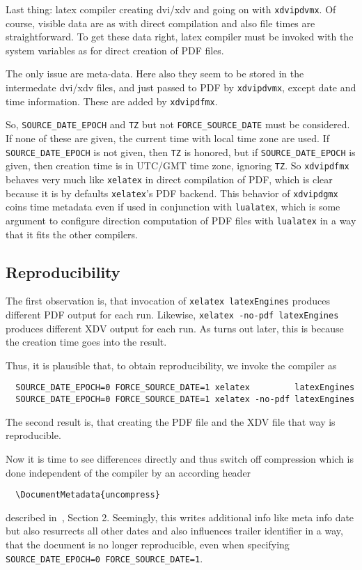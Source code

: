 \documentclass[a4paper, english]{article}%
\newcommand{\lualatex}{\texttt{lualatex}}
\newcommand{\xelatex}{\texttt{xelatex}}
\begin{document}
Last thing: 
latex compiler creating dvi/xdv and going on with \texttt{xdvipdvmx}. 
Of course, visible data are as with direct compilation and also file times are straightforward. 
To get these data right, latex compiler must be invoked with the system variables 
as for direct creation of PDF files. 

The only issue are meta-data. 
Here also they seem to be stored in the intermedate dvi/xdv files, 
and just passed to PDF by \texttt{xdvipdvmx}, 
except date and time information. 
These are added by \texttt{xdvipdfmx}. 

So, \texttt{SOURCE\_DATE\_EPOCH} and \texttt{TZ} but not \texttt{FORCE\_SOURCE\_DATE} 
must be considered. 
If none of these are given, the current time with local time zone are used. 
If \texttt{SOURCE\_DATE\_EPOCH} is not given, then \texttt{TZ} is honored, 
but if \texttt{SOURCE\_DATE\_EPOCH} is given, then creation time is in UTC/GMT time zone, 
ignoring \texttt{TZ}. 
So \texttt{xdvipdfmx} behaves very much like \xelatex{} in direct compilation of PDF, 
which is clear because it is by defaults \xelatex's PDF backend. 
This behavior of \texttt{xdvipdgmx} coins time metadata even if used in conjunction with \lualatex, 
which is some argument to configure direction computation of PDF files with \lualatex 
in a way that it fits the other compilers. 





\subsection{Reproducibility}\label{subsec:reprod}

The first observation is, that invocation of \texttt{xelatex latexEngines} 
produces different PDF output for each run. 
Likewise, \texttt{xelatex -no-pdf latexEngines} produces different XDV output for each run. 
As turns out later, this is because the creation time goes into the result. 

Thus, it is plausible that, to obtain reproducibility, we invoke the compiler as 
%
\begin{verbatim}
  SOURCE_DATE_EPOCH=0 FORCE_SOURCE_DATE=1 xelatex         latexEngines
  SOURCE_DATE_EPOCH=0 FORCE_SOURCE_DATE=1 xelatex -no-pdf latexEngines
\end{verbatim}

The second result is, that creating the PDF file and the XDV file that way is reproducible. 

Now it is time to see differences directly and thus switch off compression 
which is done independent of the compiler by an according header 
%
\begin{verbatim}
  \DocumentMetadata{uncompress}
\end{verbatim}
%
described in~\cite{DocMetaDataSuppCode}, Section 2. 
Seemingly, this writes additional info like meta info date 
but also resurrects all other dates and also influences trailer identifier in a way, 
that the document is no longer reproducible, 
even when specifying \texttt{SOURCE\_DATE\_EPOCH=0 FORCE\_SOURCE\_DATE=1}. 
\end{document}
